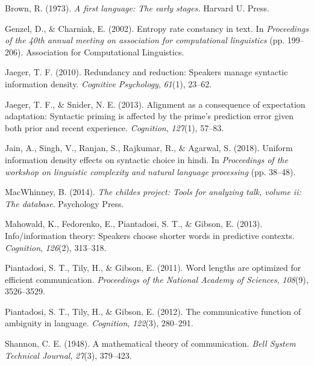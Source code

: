 \documentclass[10pt, letterpaper]{article}
\begin{document}
\setlength{\parindent}{-0.1in} 
\setlength{\leftskip}{0.125in}

\noindent

\hypertarget{refs}{}
\leavevmode\hypertarget{ref-brown1973}{}%
Brown, R. (1973). \emph{A first language: The early stages.} Harvard U.
Press.

\leavevmode\hypertarget{ref-genzel2002}{}%
Genzel, D., \& Charniak, E. (2002). Entropy rate constancy in text. In
\emph{Proceedings of the 40th annual meeting on association for
computational linguistics} (pp. 199--206). Association for Computational
Linguistics.

\leavevmode\hypertarget{ref-jaeger2010}{}%
Jaeger, T. F. (2010). Redundancy and reduction: Speakers manage
syntactic information density. \emph{Cognitive Psychology},
\emph{61}(1), 23--62.

\leavevmode\hypertarget{ref-jaeger2013}{}%
Jaeger, T. F., \& Snider, N. E. (2013). Alignment as a consequence of
expectation adaptation: Syntactic priming is affected by the prime's
prediction error given both prior and recent experience.
\emph{Cognition}, \emph{127}(1), 57--83.

\leavevmode\hypertarget{ref-jain2018}{}%
Jain, A., Singh, V., Ranjan, S., Rajkumar, R., \& Agarwal, S. (2018).
Uniform information density effects on syntactic choice in hindi. In
\emph{Proceedings of the workshop on linguistic complexity and natural
language processing} (pp. 38--48).

\leavevmode\hypertarget{ref-macwhinney2014}{}%
MacWhinney, B. (2014). \emph{The childes project: Tools for analyzing
talk, volume ii: The database}. Psychology Press.

\leavevmode\hypertarget{ref-mahowald2013}{}%
Mahowald, K., Fedorenko, E., Piantadosi, S. T., \& Gibson, E. (2013).
Info/information theory: Speakers choose shorter words in predictive
contexts. \emph{Cognition}, \emph{126}(2), 313--318.

\leavevmode\hypertarget{ref-piantadosi2011}{}%
Piantadosi, S. T., Tily, H., \& Gibson, E. (2011). Word lengths are
optimized for efficient communication. \emph{Proceedings of the National
Academy of Sciences}, \emph{108}(9), 3526--3529.

\leavevmode\hypertarget{ref-piantadosi2012}{}%
Piantadosi, S. T., Tily, H., \& Gibson, E. (2012). The communicative
function of ambiguity in language. \emph{Cognition}, \emph{122}(3),
280--291.

\leavevmode\hypertarget{ref-shannon1948}{}%
Shannon, C. E. (1948). A mathematical theory of communication.
\emph{Bell System Technical Journal}, \emph{27}(3), 379--423.
\end{document}
